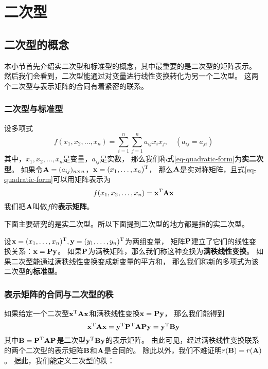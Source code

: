 \chapter{二次型}

\section{二次型的概念}
本小节首先介绍实二次型和标准型的概念，其中最重要的是二次型的矩阵表示。
然后我们会看到，二次型能通过对变量进行线性变换转化为另一个二次型。
这两个二次型与表示矩阵的合同有着紧密的联系。

\subsection{二次型与标准型}
\begin{definition}[实二次型及其矩阵表示]
  设多项式
  \begin{equation} \label{eq-quadratic-form}
    f(x_1,x_2,\dots,x_n)=\sum_{i=1}^n\sum_{j=1}^n a_{ij}x_ix_j,
    \quad (a_{ij} = a_{ji})
  \end{equation}
  其中，$x_1,x_2,\dots,x_n$是变量，$a_{ij}$是实数，
  那么我们称式\ref{eq-quadratic-form}为\textbf{实二次型}。
  如果令$\mathbf{A}=(a_{ij})_{n\times n}$，$\mathbf{x}=(x_1,\dots,x_n)^{\textrm{T}}$，
  那么$\mathbf{A}$是实对称矩阵，且式\ref{eq-quadratic-form}可以用矩阵表示为
  \begin{displaymath}
    f(x_1,x_2,\dots,x_n) = \mathbf{x}^{\textrm{T}}\mathbf{A}\mathbf{x}
  \end{displaymath}
  我们把$\mathbf{A}$叫做$f$的\textbf{表示矩阵}。
\end{definition}

\begin{remark}
  下面主要研究的是实二次型。所以下面提到二次型的地方都是指的实二次型。
\end{remark}

\begin{definition}[标准型]
  设$\mathbf{x}=(x_1,\dots,x_n)^{\textrm{T}},\mathbf{y}=(y_1,\dots,y_n)^{\textrm{T}}$为两组变量，
  矩阵$\mathbf{P}$建立了它们的线性变换关系：$\mathbf{x}=\mathbf{P}\mathbf{y}$。
  如果$\mathbf{P}$为满秩矩阵，那么我们称这种变换为\textbf{满秩线性变换}。
  如果二次型能通过满秩线性变换变成新变量的平方和，
  那么我们称新的多项式为该二次型的\textbf{标准型}。
\end{definition}

\subsection{表示矩阵的合同与二次型的秩}
如果给定一个二次型$\mathbf{x}^{\textrm{T}}\mathbf{A}\mathbf{x}$和满秩线性变换$\mathbf{x}=\mathbf{P}\mathbf{y}$，
那么我们能得到
\begin{displaymath}
\mathbf{x}^{\textrm{T}}\mathbf{A}\mathbf{x}
= \mathbf{y}^{\textrm{T}}\mathbf{P}^{\textrm{T}}\mathbf{A}\mathbf{P}\mathbf{y}
= \mathbf{y}^{\textrm{T}}\mathbf{B}\mathbf{y}
\end{displaymath}
其中$\mathbf{B}=\mathbf{P}^{\textrm{T}}\mathbf{A}\mathbf{P}$是二次型$\mathbf{y}^{\textrm{T}}\mathbf{B}\mathbf{y}$的表示矩阵。
由此可见，经过满秩线性变换联系的两个二次型的表示矩阵$\mathbf{B}$和$\mathbf{A}$是合同的。
除此以外，我们不难证明$r(\mathbf{B})=r(\mathbf{A})$。
据此，我们能定义二次型的秩：

